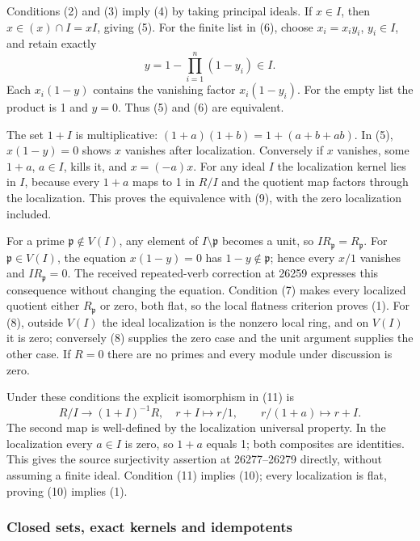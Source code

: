 Conditions (2) and (3) imply (4) by taking principal ideals. If \(x\in I\), then \(x\in(x)\cap I=xI\), giving (5). For the finite list in (6), choose \(x_i=x_i y_i\), \(y_i\in I\), and retain exactly \[
y=1-\prod_{i=1}^n(1-y_i)\in I .
\] Each \(x_i(1-y)\) contains the vanishing factor \(x_i(1-y_i)\). For the empty list the product is 1 and \(y=0\). Thus (5) and (6) are equivalent.

The set \(1+I\) is multiplicative: \((1+a)(1+b)=1+(a+b+ab)\). In (5), \(x(1-y)=0\) shows \(x\) vanishes after localization. Conversely if \(x\) vanishes, some \(1+a\), \(a\in I\), kills it, and \(x=(-a)x\). For any ideal \(I\) the localization kernel lies in \(I\), because every \(1+a\) maps to 1 in \(R/I\) and the quotient map factors through the localization. This proves the equivalence with (9), with the zero localization included.

For a prime \(\mathfrak p\notin V(I)\), any element of \(I\setminus\mathfrak p\) becomes a unit, so \(IR_{\mathfrak p}=R_{\mathfrak p}\). For \(\mathfrak p\in V(I)\), the equation \(x(1-y)=0\) has \(1-y\notin\mathfrak p\); hence every \(x/1\) vanishes and \(IR_{\mathfrak p}=0\). The received repeated-verb correction at 26259 expresses this consequence without changing the equation. Condition (7) makes every localized quotient either \(R_{\mathfrak p}\) or zero, both flat, so the local flatness criterion proves (1). For (8), outside \(V(I)\) the ideal localization is the nonzero local ring, and on \(V(I)\) it is zero; conversely (8) supplies the zero case and the unit argument supplies the other case. If \(R=0\) there are no primes and every module under discussion is zero.

Under these conditions the explicit isomorphism in (11) is \[
R/I\longrightarrow(1+I)^{-1}R,\quad r+I\mapsto r/1,
\qquad r/(1+a)\longmapsto r+I .
\] The second map is well-defined by the localization universal property. In the localization every \(a\in I\) is zero, so \(1+a\) equals 1; both composites are identities. This gives the source surjectivity assertion at 26277--26279 directly, without assuming a finite ideal. Condition (11) implies (10); every localization is flat, proving (10) implies (1).

\subsubsection{Closed sets, exact kernels and idempotents}\label{algebra-proof-022-closed-sets-exact-kernels-and-idempotents}

